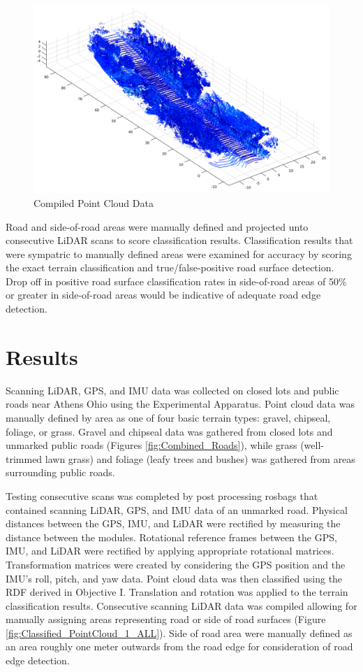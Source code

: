\documentclass[journal,onecolumn]{IEEEtran}
\begin{document}
	\begin{figure}
		\centering
		\includegraphics[width=0.7\linewidth]{figures/Compiled_PCD}
		\caption[Compiled Point Cloud Data]{Compiled Point Cloud Data}
		\label{fig:Compiled_PCD}
	\end{figure}
	
	{Road and side-of-road areas were manually defined and projected unto consecutive LiDAR scans to score classification results. Classification results that were sympatric to manually defined areas were examined for accuracy by scoring the exact terrain classification and true/false-positive road surface detection. Drop off in positive road surface classification rates in side-of-road areas of 50\% or greater in side-of-road areas would be indicative of adequate road edge detection.}
	
\section{Results}
	
	{Scanning LiDAR, GPS, and IMU data was collected on closed lots and public roads near Athens Ohio using the Experimental Apparatus. Point cloud data was manually defined by area as one of four basic terrain types: gravel, chipseal, foliage, or grass. Gravel and chipseal data was gathered from closed lots and unmarked public roads (Figures \ref{fig:Combined_Roads}), while grass (well-trimmed lawn grass) and foliage (leafy trees and bushes) was gathered from areas surrounding public roads.}

	{Testing consecutive scans was completed by post processing rosbags that contained scanning LiDAR, GPS, and IMU data of an unmarked road. Physical distances between the GPS, IMU, and LiDAR were rectified by measuring the distance between the modules. Rotational reference frames between the GPS, IMU, and LiDAR were rectified by applying appropriate rotational matrices. Transformation matrices were created by considering the GPS position and the IMU's roll, pitch, and yaw data. Point cloud data was then classified using the RDF derived in Objective I. Translation and rotation was applied to the terrain classification results. Consecutive scanning LiDAR data was compiled allowing for manually assigning areas representing road or side of road surfaces (Figure \ref{fig:Classified_PointCloud_1_ALL}). Side of road area were manually defined as an area roughly one meter outwards from the road edge for consideration of road edge detection.}
	
\end{document}
